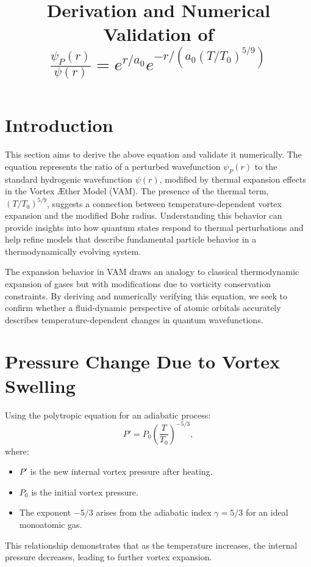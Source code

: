 \documentclass{article}
\begin{document}
  \title{Derivation and Numerical Validation of $\frac{\psi_P(r)}{\psi(r)} = e^{r/a_0} e^{-r / (a_0 (T/T_0)^{5/9})}$}
  \author{}
  \date{}
  \maketitle

  \section{Introduction}
  This section aims to derive the above equation and validate it numerically. The equation represents the ratio of a perturbed wavefunction $\psi_P(r)$ to the standard hydrogenic wavefunction $\psi(r)$, modified by thermal expansion effects in the Vortex \AE ther Model (VAM). The presence of the thermal term, $(T/T_0)^{5/9}$, suggests a connection between temperature-dependent vortex expansion and the modified Bohr radius. Understanding this behavior can provide insights into how quantum states respond to thermal perturbations and help refine models that describe fundamental particle behavior in a thermodynamically evolving system.

  The expansion behavior in VAM draws an analogy to classical thermodynamic expansion of gases but with modifications due to vorticity conservation constraints. By deriving and numerically verifying this equation, we seek to confirm whether a fluid-dynamic perspective of atomic orbitals accurately describes temperature-dependent changes in quantum wavefunctions.

  \section{Pressure Change Due to Vortex Swelling}
  Using the polytropic equation for an adiabatic process:
  \begin{equation}
    P' = P_0 \left( \frac{T}{T_0} \right)^{-5/3},
  \end{equation}
  where:
  \begin{itemize}
    \item $P'$ is the new internal vortex pressure after heating.
    \item $P_0$ is the initial vortex pressure.
    \item The exponent $-5/3$ arises from the adiabatic index $\gamma = 5/3$ for an ideal monoatomic gas.
  \end{itemize}
  This relationship demonstrates that as the temperature increases, the internal pressure decreases, leading to further vortex expansion.
\end{document}
